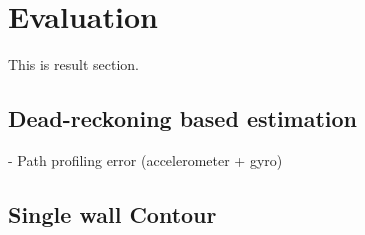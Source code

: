 \section{Evaluation}\label{sec:results}
This is result section.

%
%
% 
%
%
   
\subsection{Dead-reckoning based estimation}
   - Path profiling error (accelerometer + gyro)
   \begin{figure}[h!t]
   \end{figure}
   
\subsection{Single wall Contour}

